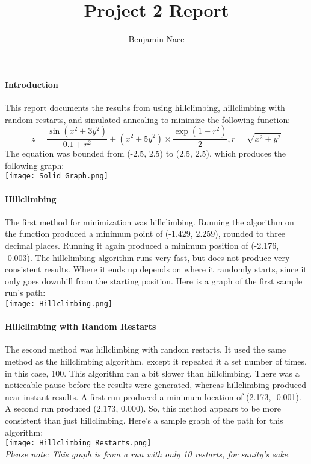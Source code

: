 \documentclass[12pt,letterpaper]{report}
\author{Benjamin Nace}
\title{Project 2 Report}
\begin{document}
\begin{titlepage}
\maketitle
\end{titlepage}
\paragraph*{Introduction}
This report documents the results from using hillclimbing, hillclimbing with random restarts, and simulated annealing to minimize the following function:\\
\begin{equation}
z = \dfrac{\sin(x^{2} + 3y^{2})}{0.1 + r^{2}} + (x^{2}+5y^{2}) \times \dfrac{\exp(1 - r^{2})}{2}, r = \sqrt{x^{2} + y^{2}}
\end{equation}
The equation was bounded from (-2.5, 2.5) to (2.5, 2.5), which produces the following graph:\\
\texttt{[image: Solid\_Graph.png]}
\paragraph*{Hillclimbing}
The first method for minimization was hillclimbing. Running the algorithm on the function produced a minimum point of (-1.429, 2.259), rounded to three decimal places. Running it again produced a minimum position of (-2.176, -0.003). The hillclimbing algorithm runs very fast, but does not produce very consistent results. Where it ends up depends on where it randomly starts, since it only goes downhill from the starting position. Here is a graph of the first sample run's path:\\
\texttt{[image: Hillclimbing.png]}
\paragraph*{Hillclimbing with Random Restarts}
The second method was hillclimbing with random restarts. It used the same method as the hillclimbing algorithm, except it repeated it a set number of times, in this case, 100. This algorithm ran a bit slower than hillclimbing. There was a noticeable pause before the results were generated, whereas hillclimbing produced near-instant results. A first run produced a minimum location of (2.173, -0.001). A second run produced (2.173, 0.000). So, this method appears to be more consistent than just hillclimbing. Here's a sample graph of the path for this algorithm:\\
\texttt{[image: Hillclimbing\_Restarts.png]}\\
\textit{Please note: This graph is from a run with only 10 restarts, for sanity's sake.}
\end{document}
